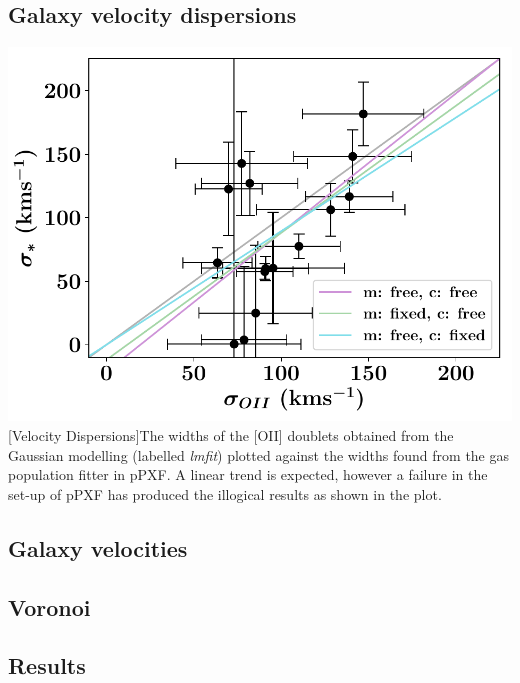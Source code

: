\documentclass[12pt, twocolumn]{revtex4}    %
\begin{document}

\subsection{Galaxy velocity dispersions}

\begin{center}
\includegraphics[width=1.0\linewidth]{data/sigma_star_vs_sigma_oii}
[Velocity Dispersions]{The widths of the [OII] doublets obtained from the Gaussian modelling (labelled \textit{lmfit}) plotted against the widths found from the gas population fitter in pPXF. A linear trend is expected, however a failure in the set-up of pPXF has produced the illogical results as shown in the plot.}
\label{fig:oii_widths}
\end{center}

\subsection{Galaxy velocities}

\subsection{Voronoi}

\subsection{Results}
\end{document}
